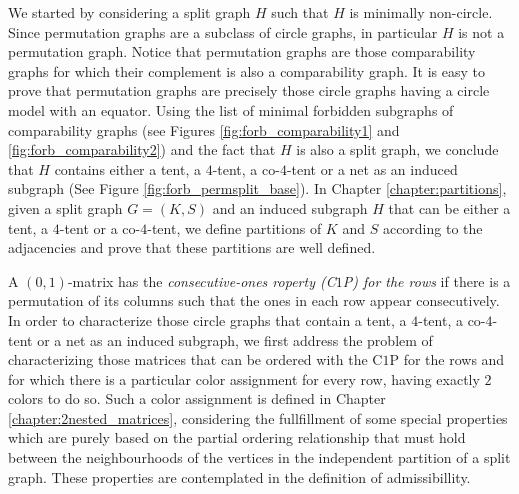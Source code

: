 \documentclass[12pt]{book}
\theoremstyle{plain}
\theoremstyle{remark}
\begin{document}
We started by considering a split graph $H$ such that $H$ is minimally non-circle. Since permutation graphs are a subclass of circle graphs, in particular $H$ is not a permutation graph. Notice that permutation graphs are those comparability graphs for which their complement is also a comparability graph. It is easy to prove that permutation graphs are precisely those circle graphs having a circle model with an equator.
Using the list of minimal forbidden subgraphs of comparability graphs (see Figures \ref{fig:forb_comparability1} and \ref{fig:forb_comparability2}) and the fact that $H$ is also a split graph, we conclude that $H$ contains either a tent, a $4$-tent, a co-$4$-tent or a net as an induced subgraph (See Figure \ref{fig:forb_permsplit_base}).
In Chapter \ref{chapter:partitions}, given a split graph $G=(K,S)$ and an induced subgraph $H$ that can be either a tent, a $4$-tent or a co-$4$-tent, we define partitions of $K$ and $S$ according to the adjacencies and prove that these partitions are well defined.

A $(0,1)$-matrix has the \emph{consecutive-ones roperty (C$1$P) for the rows} if there is a permutation of its columns such that the ones in each row appear consecutively. 
In order to characterize those circle graphs that contain a tent, a $4$-tent, a co-$4$-tent or a net as an induced subgraph, we first address the problem of characterizing those matrices that can be ordered with the C$1$P for the rows and for which there is a particular color assignment for every row, having exactly $2$ colors to do so. Such a color assignment is defined in Chapter \ref{chapter:2nested_matrices}, considering the fullfillment of some special properties which are purely based on the partial ordering relationship that must hold between the neighbourhoods of the vertices in the independent partition of a split graph. These properties are contemplated in the definition of admissibillity.
\end{document}
